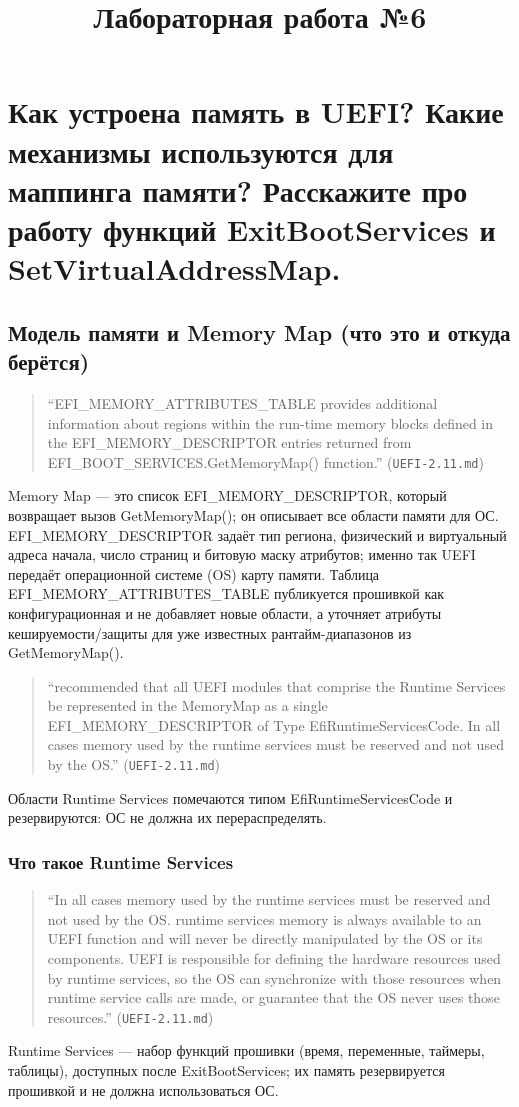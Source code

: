 \documentclass[a4paper,12pt]{article}
\title{Лабораторная работа №6}
\author{}
\date{}
\begin{document}
\maketitle

\tableofcontents
\newpage

\section{Как устроена память в UEFI? Какие механизмы используются для маппинга памяти? Расскажите про работу функций ExitBootServices и SetVirtualAddressMap.}
\subsection{Модель памяти и Memory Map (что это и откуда берётся)}
\begin{quote}
``EFI\_MEMORY\_ATTRIBUTES\_TABLE provides additional information about regions within the run-time memory blocks defined in the EFI\_MEMORY\_DESCRIPTOR entries returned from EFI\_BOOT\_SERVICES.GetMemoryMap() function.'' (\texttt{UEFI-2.11.md})
\end{quote}
Memory Map — это список EFI\_MEMORY\_DESCRIPTOR, который возвращает вызов GetMemoryMap(); он описывает все области памяти для ОС. EFI\_MEMORY\_DESCRIPTOR задаёт тип региона, физический и виртуальный адреса начала, число страниц и битовую маску атрибутов; именно так UEFI передаёт операционной системе (OS) карту памяти. Таблица EFI\_MEMORY\_ATTRIBUTES\_TABLE публикуется прошивкой как конфигурационная и не добавляет новые области, а уточняет атрибуты кешируемости/защиты для уже известных рантайм-диапазонов из GetMemoryMap().
\begin{quote}
``recommended that all UEFI modules that comprise the Runtime Services be represented in the MemoryMap as a single EFI\_MEMORY\_DESCRIPTOR of Type EfiRuntimeServicesCode. In all cases memory used by the runtime services must be reserved and not used by the OS.'' (\texttt{UEFI-2.11.md})
\end{quote}
Области Runtime Services помечаются типом EfiRuntimeServicesCode и резервируются: ОС не должна их перераспределять.




\subsubsection{Что такое Runtime Services}
\begin{quote}
``In all cases memory used by the runtime services must be reserved and not used by the OS. runtime services memory is always available to an UEFI function and will never be directly manipulated by the OS or its components. UEFI is responsible for defining the hardware resources used by runtime services, so the OS can synchronize with those resources when runtime service calls are made, or guarantee that the OS never uses those resources.'' (\texttt{UEFI-2.11.md})
\end{quote}
Runtime Services — набор функций прошивки (время, переменные, таймеры, таблицы), доступных после ExitBootServices; их память резервируется прошивкой и не должна использоваться ОС.
\end{document}
